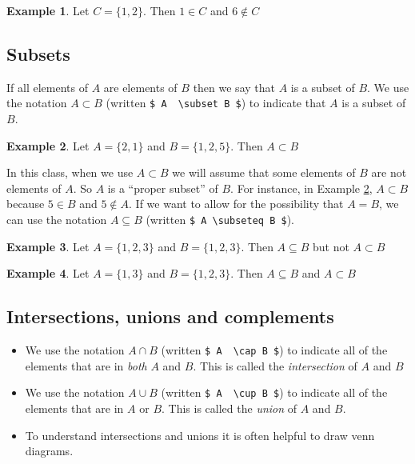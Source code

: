 \documentclass[]{article}
\theoremstyle{definition}
\newtheorem{exmp}{Example}[section]
\begin{document}
\begin{exmp}
Let $ C= \{1, 2\}$. Then $1 \in C$ and $6 \notin C$
\end{exmp}


\subsection{Subsets}

If all elements of $A$ are elements of $B$ then we say that $A$ is a subset of $B$.  We use the notation $ A \subset B$ (written \verb|$ A  \subset B $|) to indicate that $A$ is a subset of $B$.

\begin{exmp}\label{e:subset}
Let $ A= \{2, 1\}$ and $B = \{1,2,5\}$. Then $A \subset B$
\end{exmp}

In this class, when we use $ A \subset B$ we will assume that some elements of $B$ are not elements of $A$. So $A$ is a ``proper subset'' of $B$. For instance, in Example \ref{e:subset}, $A \subset B$ because $5 \in B$ and $5 \notin A$. If we want to allow for the possibility that $A=B$, we can use the notation $A \subseteq B$ (written \verb|$ A \subseteq B $|). 

\begin{exmp}
Let $ A= \{1, 2,3 \}$ and $B = \{1,2,3\}$. Then $A \subseteq B$ but not $A \subset B$
\end{exmp}

\begin{exmp}
Let $ A= \{1, 3 \}$ and $B = \{1,2,3\}$. Then $A \subseteq B$ and $A \subset B$
\end{exmp}

\subsection{Intersections, unions and complements}

\begin{itemize}

\item We use the notation $A \cap B$ (written \verb|$ A  \cap B $|) to indicate all of the elements that are in \textit{both} $A$ and $B$. This is called the \textit{intersection} of $A$ and $B$

\item We use the notation $A \cup B$ (written \verb|$ A  \cup B $|) to indicate all of the elements that are in $A$ or $B$. This is called the \textit{union} of $A$ and $B$.

\item To understand intersections and unions it is often helpful to draw venn diagrams. 

\end{itemize}
\end{document}
